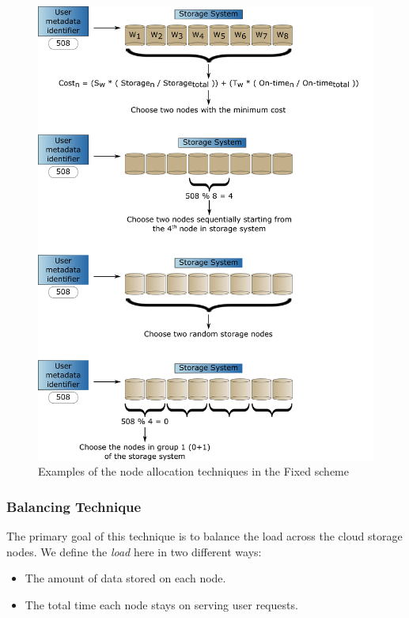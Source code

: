\begin{figure}[!htbp]
\centering
\includegraphics[width=\columnwidth,keepaspectratio]{FIG2.pdf}
\caption{Examples of the node allocation techniques in the Fixed scheme}
\label{fixed_examples}
\end{figure}

\subsubsection{Balancing Technique}
\label{baltechnique}
The primary goal of this technique is to balance the load across the cloud storage nodes. We
define the \textit{load} here in two different ways:

\begin{itemize}
\item The amount of data stored on each node.
\item The total time each node stays on serving user requests.
\end{itemize}

